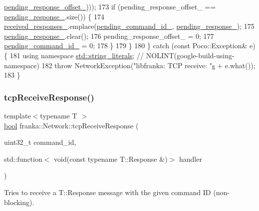 \begin{DoxyCode}
      \hyperlink{classfranka_1_1Network_a6b514fb4c63a98080b346ac85f717739}{pending\_response\_offset\_})));
173     \textcolor{keywordflow}{if} (pending\_response\_offset\_ == \hyperlink{classfranka_1_1Network_a745d141f621767ebd98662e1239ab039}{pending\_response\_}.size()) \{
174       \hyperlink{classfranka_1_1Network_a99270a962346224117a68e309a01e054}{received\_responses\_}.emplace(\hyperlink{classfranka_1_1Network_a5164b5782401061ed04063da53c1e188}{pending\_command\_id\_}, 
      \hyperlink{classfranka_1_1Network_a745d141f621767ebd98662e1239ab039}{pending\_response\_});
175       \hyperlink{classfranka_1_1Network_a745d141f621767ebd98662e1239ab039}{pending\_response\_}.clear();
176       pending\_response\_offset\_ = 0;
177       \hyperlink{classfranka_1_1Network_a5164b5782401061ed04063da53c1e188}{pending\_command\_id\_} = 0;
178     \}
179   \}
180 \} \textcolor{keywordflow}{catch} (\textcolor{keyword}{const} Poco::Exception& e) \{
181   \textcolor{keyword}{using namespace }\hyperlink{namespacestd_1_1string__literals}{std::string\_literals};  \textcolor{comment}{// NOLINT(google-build-using-namespace)}
182   \textcolor{keywordflow}{throw} NetworkException(\textcolor{stringliteral}{"libfranka: TCP receive: "}\hyperlink{namespaceservice__node__3_aa976421a49e0b54f23833423400849ae}{s} + e.what());
183 \}
\end{DoxyCode}
\mbox{\label{classfranka_1_1Network_a7457dce9d5a6850c29ee9b66da04a749}} 
\subsubsection{\texorpdfstring{tcp\+Receive\+Response()}{tcpReceiveResponse()}}
{\footnotesize\ttfamily template$<$typename T $>$ \\
\hyperlink{classbool}{bool} franka\+::\+Network\+::tcp\+Receive\+Response (\begin{DoxyParamCaption}\item[{uint32\+\_\+t}]{command\+\_\+id,  }\item[{std\+::function$<$ void(const typename T\+::\+Response \&)$>$}]{handler }\end{DoxyParamCaption})}

Tries to receive a T\+::\+Response message with the given command ID (non-\/blocking).

